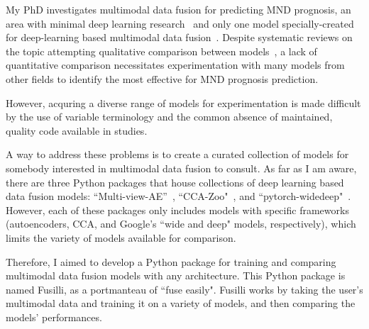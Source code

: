 My PhD investigates multimodal data fusion for predicting MND prognosis, an area with minimal deep learning research~\cite{pancottiDeepLearningMethods2022, mullerExplainableModelsDisease2021} and only one model specially-created for deep-learning based multimodal data fusion~\cite{vanderburghDeepLearningPredictions2017}.
Despite systematic reviews on the topic attempting qualitative comparison between models~\cite{cuiDeepMultimodalFusion2022, gaoSurveyDeepLearning2020, stahlschmidtMultimodalDeepLearning2022, yanDeepMultiviewLearning2021}, a lack of quantitative comparison necessitates experimentation with many models from other fields to identify the most effective for MND prognosis prediction.

However, acquring a diverse range of models for experimentation is made difficult by the use of variable terminology and the common absence of maintained, quality code available in studies.

A way to address these problems is to create a curated collection of models for somebody interested in multimodal data fusion to consult.
As far as I am aware, there are three Python packages that house collections of deep learning based data fusion models: ``Multi-view-AE''~\cite{aguilaMultiviewAEPythonPackage2023}, ``CCA-Zoo"~\cite{chapmanCCAZooCollectionRegularized2021}, and ``pytorch-widedeep"~\cite{zaurinPytorchwidedeepFlexiblePackage2023}.
However, each of these packages only includes models with specific frameworks (autoencoders, CCA, and Google's ``wide and deep" models, respectively), which limits the variety of models available for comparison.

Therefore, I aimed to develop a Python package for training and comparing multimodal data fusion models with any architecture.
This Python package is named Fusilli, as a portmanteau of ``fuse easily".
Fusilli works by taking the user's multimodal data and training it on a variety of models, and then comparing the models' performances.

